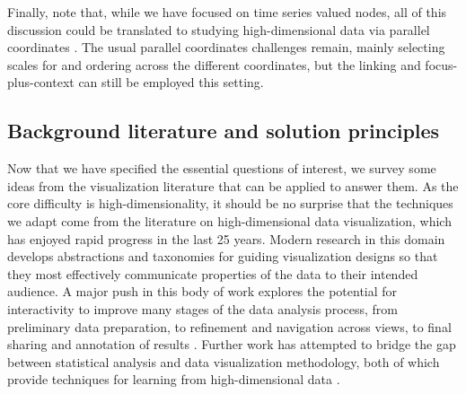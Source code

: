Finally, note that, while we have focused on time series valued nodes,
all of this discussion could be translated to studying high-dimensional
data via parallel coordinates \citep{inselberg1991parallel}. The usual parallel
coordinates challenges remain, mainly selecting scales for and ordering
across the different coordinates, but the linking and focus-plus-context
can still be employed this setting.

\subsection{Background literature and solution principles}
\label{background-literature-and-solution-principles}

Now that we have specified the essential questions of interest, we survey some
ideas from the visualization literature that can be applied to answer them. As
the core difficulty is high-dimensionality, it should be no surprise that the
techniques we adapt come from the literature on high-dimensional data
visualization, which has enjoyed rapid progress in the last 25 years. Modern
research in this domain develops abstractions and taxonomies for guiding
visualization designs so that they most effectively communicate properties of
the data to their intended audience. A major push in this body of work explores
the potential for interactivity to improve many stages of the data analysis
process, from preliminary data preparation, to refinement and navigation across
views, to final sharing and annotation of results \citep{heer2012taxonomy}.
Further work has attempted to bridge the gap between statistical analysis and
data visualization methodology, both of which provide techniques for learning
from high-dimensional data \citep{de2003visual}.

